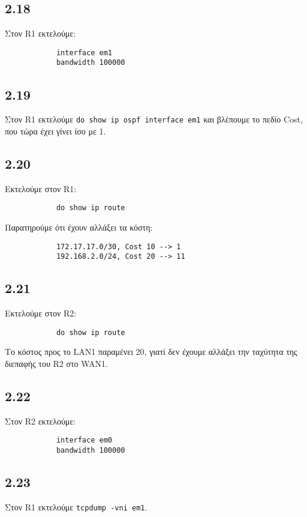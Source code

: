 \documentclass[a4paper, 12pt]{article}
\begin{document}
	\subsection*{2.18}
		Στον R1 εκτελούμε:
		
		\begin{verbatim}
			interface em1
			bandwidth 100000
		\end{verbatim}

	\subsection*{2.19}
		Στον R1 εκτελούμε \verb|do show ip ospf interface em1| και βλέπουμε το πεδίο Cost, που τώρα έχει γίνει ίσο με 1.

	\subsection*{2.20}
		Εκτελούμε στον R1:
		
		\begin{verbatim}
			do show ip route
		\end{verbatim}
		
		Παρατηρούμε ότι έχουν αλλάξει τα κόστη:
		
		\begin{verbatim}
			172.17.17.0/30, Cost 10 --> 1
			192.168.2.0/24, Cost 20 --> 11
		\end{verbatim}

	\subsection*{2.21}
		Εκτελούμε στον R2:
		
		\begin{verbatim}
			do show ip route
		\end{verbatim}
		
		Το κόστος προς το LAN1 παραμένει 20, γιατί δεν έχουμε αλλάξει την ταχύτητα της διεπαφής του R2 στο WAN1. 

	\subsection*{2.22}
		Στον R2 εκτελούμε:
		
		\begin{verbatim}
			interface em0
			bandwidth 100000
		\end{verbatim}

	\subsection*{2.23}
		Στον R1 εκτελούμε \verb|tcpdump -vni em1|.
\end{document}
